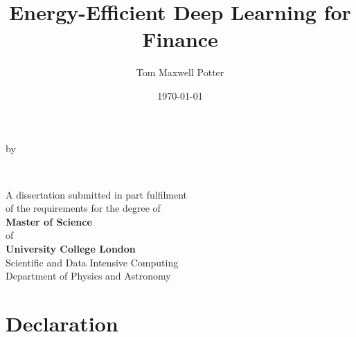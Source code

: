 \documentclass[a4paper, 12pt]{report}
\title{Energy-Efficient Deep Learning for Finance}
\author{Tom Maxwell Potter}
\date{\today}
\begin{document}
    \begin{titlepage}
        \begin{center}
            \vspace*{1cm}
            
            \vfill
            
            \makeatletter
            {\Huge\textbf{\@title}}


            \vspace{0.8cm}
            by
            \vspace{0.8cm}

            {\Large\textbf{\@author}}

            \vspace{1.5cm}
            {\textbf{\\\@date}}

            \vfill

            {A dissertation submitted in part fulfilment\\
            of the requirements for the degree of\\}
            {
            \textbf{Master of Science}\\
            of\\
            \textbf{University College London\\}}
            \vspace{1cm}
            {Scientific and Data Intensive Computing\\
            Department of Physics and Astronomy}

            \vspace{2cm}
        \end{center}
    \end{titlepage}


    \chapter*{Declaration}
    \blindtext 
\end{document}
